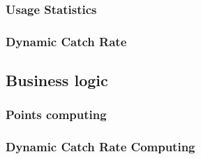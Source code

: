 \subsubsection{Usage Statistics}
\subsubsection{Dynamic Catch Rate}


\subsection{Business logic}
\subsubsection{Points computing}
\subsubsection{Dynamic Catch Rate Computing}


